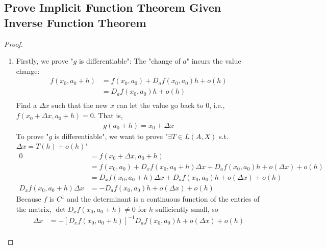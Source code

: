 \documentclass[11pt]{elegantbook}
\begin{document}
\subsection{Prove Implicit Function Theorem Given Inverse Function Theorem}
\begin{proof}
    \begin{enumerate}
        \item Firstly, we prove "$g$ is differentiable":
        The "change of $a$" incurs the value change:
        \begin{equation}
            \begin{aligned}
                f(x_0,a_0+h)&=f(x_0,a_0)+D_af(x_0,a_0)h+o(h)\\
                &=D_af(x_0,a_0)h+o(h)\\
            \end{aligned}
            \nonumber
        \end{equation}
        Find a $\Delta x$ such that the new $x$ can let the value go back to $0$, i.e., $f(x_0+\Delta x,a_0+h)=0$. That is,
        \begin{equation}
            \begin{aligned}
                g(a_0+h)=x_0+\Delta x
            \end{aligned}
            \nonumber
        \end{equation}
        To prove "$g$ is differentiable", we want to prove "$\exists T\in L(A,X)$ s.t. $\Delta x=T(h)+o(h)$"
        \begin{equation}
            \begin{aligned}
                0&=f(x_0+\Delta x,a_0+h)\\
                &=f(x_0,a_0)+D_xf(x_0,a_0+h)\Delta x+ D_a f(x_0,a_0)h+o(\Delta x)+o(h)\\
                &=D_xf(x_0,a_0+h)\Delta x+ D_a f(x_0,a_0)h+o(\Delta x)+o(h)\\
                D_x f(x_0,a_0+h)\Delta x&=-D_a f(x_0,a_0)h+o(\Delta x)+o(h)
            \end{aligned}
            \nonumber
        \end{equation}
        Because $f$ is $C^1$ and the determinant is a continuous function of the entries of the matrix, $\det D_xf(x_0, a_0 + h) \neq 0$ for $h$ sufficiently small, so
        \begin{equation}
            \begin{aligned}
                \Delta x&= -[D_x f(x_0,a_0+h)]^{-1}D_a f(x_0,a_0)h+o(\Delta x)+o(h)\\

\end{aligned}
\end{equation}
\end{enumerate}
\end{proof}
\end{document}
